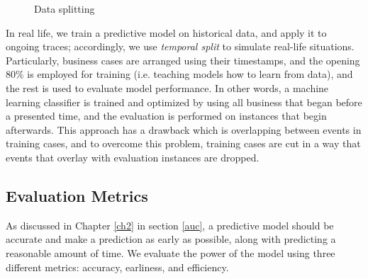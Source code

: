 \begin{figure}[htb]
	\begin{center}
		\caption{Data splitting}
		\label{fig:all3}
	\end{center}
\end{figure}

In real life, we train a predictive model on historical data, and apply it to ongoing traces; accordingly, we use \textit{temporal split} to simulate real-life situations. Particularly, business cases are arranged using their timestamps, and the opening $80\%$ is employed for training (i.e. teaching models how to learn from data), and the rest is used to evaluate model performance. In other words, a machine learning classifier is trained and optimized by using all business  that began before a presented time, and the evaluation  is performed on instances  that begin afterwards. This approach has a drawback which is overlapping between events in training cases, and to overcome this problem, training cases are cut in a way that events that overlay with evaluation instances are dropped.




\subsection{Evaluation Metrics} \label{evm}
As discussed in Chapter \ref{ch2} in section \ref{auc}, a predictive model should be accurate and make a prediction as early as possible, along with predicting a reasonable amount of time. We evaluate the power of the model using three different metrics: accuracy, earliness, and efficiency.

